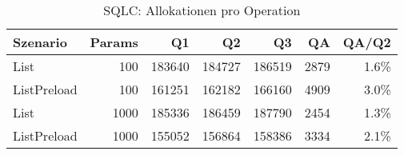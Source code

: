\begin{table}[ht]
\centering
\caption{SQLC: Allokationen pro Operation}
\begin{tabular}{lrrrrrr}
\toprule
Szenario & Params & Q1 & Q2 & Q3 & QA & QA/Q2 \\
\midrule
		List & 100 & 183640 & 184727 & 186519 & 2879 & 1.6\% \\
		ListPreload & 100 & 161251 & 162182 & 166160 & 4909 & 3.0\% \\
		List & 1000 & 185336 & 186459 & 187790 & 2454 & 1.3\% \\
		ListPreload & 1000 & 155052 & 156864 & 158386 & 3334 & 2.1\% \\
\bottomrule
\end{tabular}
\label{tab:benchmark_sqlc_allocsperop}
\end{table}
	